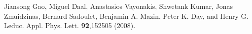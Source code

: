 \documentclass{report}
\begin{document}
\begin{thebibliography}{99}
Jiansong Gao, Miguel Daal, Anastasios Vayonakis, Shwetank Kumar, Jonas Zmuidzinas, Bernard Sadoulet, Benjamin A. Mazin, Peter K. Day, and Henry G. Leduc.  Appl. Phys. Lett. \textbf{92},152505 (2008).

\end{thebibliography}
\end{document}
